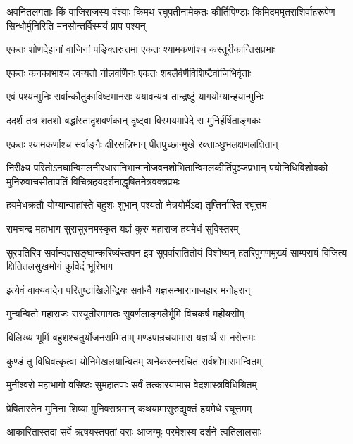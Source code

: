 \twolineshloka
{अवनितलगताः किं वाजिराजस्य वंश्याः किमथ रघुपतीनामेकतः कीर्तिपिण्डाः}
{किमिदममृतराशिर्वाहरूपेण सिन्धोर्मुनिरिति मनसोन्तर्विस्मयं प्राप पश्यन्}%

\twolineshloka
{एकतः शोणदेहानां वाजिनां पङ्क्तिरुत्तमा}
{एकतः श्यामकर्णाश्च कस्तूरीकान्तिसप्रभाः}%

\twolineshloka
{एकतः कनकाभाश्च त्वन्यतो नीलवर्णिनः}
{एकतः शबलैर्वर्णैर्विशिष्टैर्वाजिभिर्वृताः}%

\twolineshloka
{एवं पश्यन्मुनिः सर्वान्कौतुकाविष्टमानसः}
{ययावन्यत्र तान्द्रष्टुं यागयोग्यान्हयान्मुनिः}%

\twolineshloka
{ददर्श तत्र शतशो बद्धांस्तादृशवर्णकान्}
{दृष्ट्वा विस्मयमापेदे स मुनिर्हर्षिताङ्गकः}%

\twolineshloka
{एकतः श्यामकर्णांश्च सर्वाङ्गैः क्षीरसन्निभान्}
{पीतपुच्छान्मुखे रक्ताञ्छुभलक्षणलक्षितान्}%

\twolineshloka
{निरीक्ष्य परितोऽनघान्विमलनीरधारानिभान्मनोजवनशोभितान्विमलकीर्तिपुञ्जप्रभान्}
{पयोनिधिविशोषको मुनिरुवाचसीतापतिं विचित्रहयदर्शनाद्धृषितनेत्रवक्त्रप्रभः}%


\twolineshloka
{हयमेधक्रतौ योग्यान्वाहांस्ते बहुशः शुभान्}
{पश्यतो नेत्रयोर्मेऽद्य तृप्तिर्नास्ति रघूत्तम}%

\twolineshloka
{रामचन्द्र महाभाग सुरासुरनमस्कृत}
{यज्ञं कुरु महाराज हयमेधं सुविस्तरम्}%

\twolineshloka
{सुरपतिरिव सर्वान्यज्ञसङ्घान्करिष्यंस्तपन इव सुपर्वारातितोयं विशोष्यन्}
{हतरिपुगणमुख्यं साम्परायं विजित्य क्षितितलसुखभोगं कुर्विदं भूरिभाग}%

\twolineshloka
{इत्येवं वाक्यवादेन परितुष्टाखिलेन्द्रियः}
{सर्वान्वै यज्ञसम्भारानाजहार मनोहरान्}%

\twolineshloka
{मुन्यन्वितो महाराजः सरयूतीरमागतः}
{सुवर्णलाङ्गलैर्भूमिं विचकर्ष महीयसीम्}%

\twolineshloka
{विलिख्य भूमिं बहुशश्चतुर्योजनसम्मिताम्}
{मण्डपान्रचयामास यज्ञार्थं स नरोत्तमः}%

\twolineshloka
{कुण्डं तु विधिवत्कृत्वा योनिमेखलयान्वितम्}
{अनेकरत्नरचितं सर्वशोभासमन्वितम्}%

\twolineshloka
{मुनीश्वरो महाभागो वसिष्ठः सुमहातपाः}
{सर्वं तत्कारयामास वेदशास्त्रविधिश्रितम्}%

\twolineshloka
{प्रेषितास्तेन मुनिना शिष्या मुनिवराश्रमान्}
{कथयामासुरुद्युक्तं हयमेधे रघूत्तमम्}%

\twolineshloka
{आकारितास्तदा सर्वे ऋषयस्तपतां वराः}
{आजग्मुः परमेशस्य दर्शने त्वतिलालसाः}%

